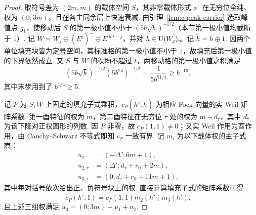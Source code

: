 \begin{proof}
取符号差为 $(2m,m)$ 的载体空间 $S$，其非零载体形式 $\phi^\circ$ 在无穷位全纯、权为 $(0;3m)$，且在各主同余层上快速衰减. 由引理~\ref{lem:c-peak-carrier} 选取峰值点 $g_1$，使移动后 $S$ 的第一极小值不小于 $(5b\sqrt b)^{-1/2}$（本节第一极小值均截断于 $1$）. 记 $\widetilde W=W_j\oplus(E^j)^-\oplus E^{3m-j}$，并对 $h\in \operatorname{U}(W_j)_\infty$ 记 $\widetilde h=h\oplus1$. 因两个单位填充块皆为定号空间，其标准格的第一极小值不小于 $1$，故填充后第一极小值的下界依然成立. 又 $S$ 与 $\widetilde W$ 的秩均不超过 $t$，两移动格的第一极小值之积满足
\[
 (5b\sqrt b)^{-1/2}(5b^{24})^{-1/2}
 =\frac{1}{5b^{51/4}}\ge b^{-13},
\]
其中末步用到了 $b^{1/4}\ge5$.

记 $P$ 为 $S,\widetilde W$ 上固定的填充子式乘积，$c_P(h',\widetilde h)$ 为相应 Fock 向量的实 Weil 矩阵系数. 第一酉特征的权为 $m$，第二酉特征在无穷位 $\tau$ 处的权为 $m-d_\tau$，其中 $d_\tau$ 为该下降对正权图形的列数. 因 $P$ 非零，故 $c_P(1,1)\ne0$；又实 Weil 作用为酉作用，由 Cauchy--Schwarz 不等式即知 $c_P$ 一致有界. 记 $m_i$ 为以下载体权的主子式商：
\[
 \begin{aligned}
 u_1&=(-\Delta';6m+1), \\
 u_{2,\tau}&=(\Delta';d_\tau+r_0+2m), \\
 u_{3,\tau}&=(0;d_\tau+r_0+11m+1),
 \end{aligned}
\]
其中每对括号依次给出正、负符号块上的权. 直接计算填充子式的矩阵系数可得
\[
 c_P(h',1)=c_P(1,1)m_2(h')\overline{m_3(h')},
\]
且上述三组权满足 $u_3=(0;3m)+u_1+u_2$.


\end{proof}
